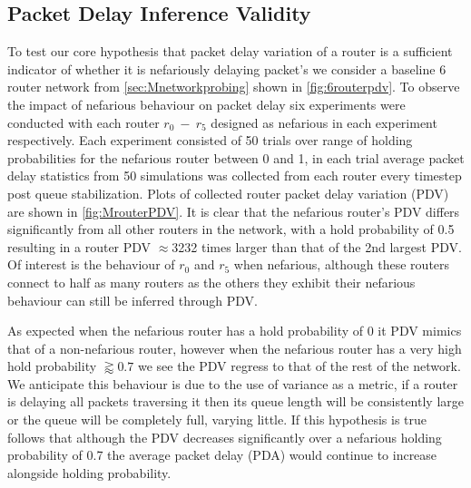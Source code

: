 \subsection*{Packet Delay Inference Validity}
To test our core hypothesis that packet delay variation of a router is a sufficient indicator of whether it is nefariously delaying packet's we consider a baseline 6 router network from \cref{sec:Mnetworkprobing} shown in \cref{fig:6routerpdv}. To observe the impact of nefarious behaviour on packet delay six experiments were conducted with each router $r_0\ -\ r_5$ designed as nefarious in each experiment respectively. Each experiment consisted of 50 trials over range of holding probabilities for the nefarious router between 0 and 1, in each trial average packet delay statistics from 50 simulations was collected from each router every timestep post queue stabilization. Plots of collected router packet delay variation (PDV) are shown in \cref{fig:MrouterPDV}. It is clear that the nefarious router's PDV differs significantly from all other routers in the network, with a hold probability of 0.5 resulting in a router PDV $\approx$3232 times larger than that of the 2nd largest PDV. Of interest is the behaviour of $r_0$ and $r_5$ when nefarious, although these routers connect to half as many routers as the others they exhibit their nefarious behaviour can still be inferred through PDV.\par
As expected when the nefarious router has a hold probability of 0 it PDV mimics that of a non-nefarious router, however when the nefarious router has a very high hold probability $\gtrapprox 0.7$ we see the PDV regress to that of the rest of the network. We anticipate this behaviour is due to the use of variance as a metric, if a router is delaying all packets traversing it then its queue length will be consistently large or the queue will be completely full, varying little. If this hypothesis is true follows that although the PDV decreases significantly over a nefarious holding probability of 0.7 the average packet delay (PDA) would continue to increase alongside holding probability. 
